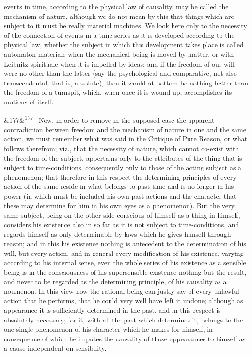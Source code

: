 \documentclass[12pt]{article}
\newcommand{\para}[1][]{\par\noindent\ifx&#1&\else\textsuperscript{\footnotesize #1}~\fi}
\begin{document}
events in time, according to the physical law of causality, may be called the mechanism of nature, although we do not mean by this that things which are subject to it must be really material machines. We look here only to the necessity of the connection of events in a time-series as it is developed according to the physical law, whether the subject in which this development takes place is called automaton materiale when the mechanical being is moved by matter, or with Leibnitz spirituale when it is impelled by ideas; and if the freedom of our will were no other than the latter (say the psychological and comparative, not also transcendental, that is, absolute), then it would at bottom be nothing better than the freedom of a turnspit, which, when once it is wound up, accomplishes its motions of itself.

\para[177] Now, in order to remove in the supposed case the apparent contradiction between freedom and the mechanism of nature in one and the same action, we must remember what was said in the Critique of Pure Reason, or what follows therefrom; viz., that the necessity of nature, which cannot co-exist with the freedom of the subject, appertains only to the attributes of the thing that is subject to time-conditions, consequently only to those of the acting subject as a phenomenon; that therefore in this respect the determining principles of every action of the same reside in what belongs to past time and is no longer in his power (in which must be included his own past actions and the character that these may determine for him in his own eyes as a phenomenon). But the very same subject, being on the other side conscious of himself as a thing in himself, considers his existence also in so far as it is not subject to time-conditions, and regards himself as only determinable by laws which he gives himself through reason; and in this his existence nothing is antecedent to the determination of his will, but every action, and in general every modification of his existence, varying according to his internal sense, even the whole series of his existence as a sensible being is in the consciousness of his supersensible existence nothing but the result, and never to be regarded as the determining principle, of his causality as a noumenon. In this view now the rational being can justly say of every unlawful action that he performs, that he could very well have left it undone; although as appearance it is sufficiently determined in the past, and in this respect is absolutely necessary; for it, with all the past which determines it, belongs to the one single phenomenon of his character which he makes for himself, in consequence of which he imputes the causality of those appearances to himself as a cause independent on sensibility.
\end{document}
